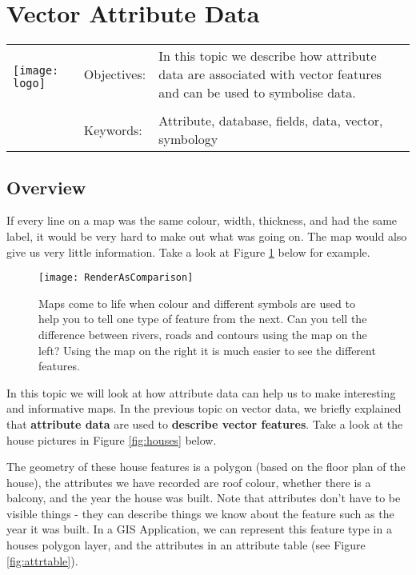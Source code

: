 

\section{Vector Attribute Data}\label{sec:attributes}
\begin{tabular}{p{3.5cm}p{6cm}p{6cm}}
\multirow{2}{*}{\texttt{[image: logo]}} & Objectives: &
In this topic we describe how attribute data are associated with vector
features and can be used to symbolise data. \\
& & \\
& Keywords: & 
Attribute, database, fields, data, vector, symbology \\
\hline
\end{tabular}

\subsection{Overview}

If every line on a map was the same colour, width, thickness, and had the
same label, it would be very hard to make out what was going on. The map
would also give us very little information. Take a look at Figure
\ref{fig:rendercompare} below for example. 

\begin{figure}[ht]
   \begin{center}
   \caption{Maps come to life when colour and different symbols are used to
help you to tell one type of feature from the next. Can you tell the
difference between rivers, roads and contours using the map on the left?
Using the map on the right it is much easier to see the different features.}
\label{fig:rendercompare}\smallskip
   \texttt{[image: RenderAsComparison]}
\end{center}
\end{figure}

In this topic we will look at how attribute data can help us to make
interesting and informative maps. In the previous topic on vector data, we
briefly explained that \textbf{attribute data} are used to \textbf{describe
vector features}. Take a look at the house pictures in Figure
\ref{fig:houses} below.

The geometry of these house features is a polygon (based on the floor plan of
the house), the attributes we have recorded are roof colour, whether there is
a balcony, and the year the house was built. Note that attributes don't have
to be visible things - they can describe things we know about the feature
such as the year it was built. In a GIS Application, we can represent this
feature type in a houses polygon layer, and the attributes in an attribute
table (see Figure \ref{fig:attrtable}).

